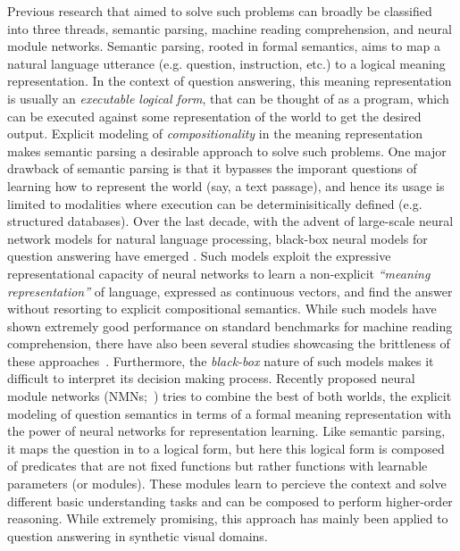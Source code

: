 \documentclass[main.tex]{subfiles}
\begin{document}
Previous research that aimed to solve such problems can broadly be classified into three threads, semantic parsing, machine reading comprehension, and neural module networks.  Semantic parsing, rooted in formal semantics, aims to map a natural language utterance (e.g. question, instruction, etc.) to a logical meaning representation.  In the context of question answering, this meaning representation is usually an \textit{executable logical form}, that can be thought of as a program, which can be executed against some representation of the world to get the desired output.  Explicit modeling of \textit{compositionality} in the meaning representation makes semantic parsing a desirable approach to solve such problems.
One major drawback of semantic parsing is that it bypasses the imporant questions of learning how to represent the world (say, a text passage), and hence its usage is limited to modalities where execution can be determinisitically defined (e.g. structured databases).
Over the last decade, with the advent of large-scale neural network models for natural language processing, black-box neural models for question answering have emerged \cite{bidaf-2016,qanet-2018,bert-2018}.
Such models exploit the expressive representational capacity of neural networks to learn a non-explicit \textit{``meaning representation''} of language, expressed as continuous vectors, and find the answer without resorting to explicit compositional semantics.  While such models have shown extremely good performance on standard benchmarks for machine reading comprehension, there have also been several studies showcasing the brittleness of these approaches~\cite{adversarial-squad-2017,sears-2018,pathologies-nlp-2018}.  Furthermore, the \textit{black-box} nature of such models makes it difficult to interpret its decision making process.
Recently proposed neural module networks (NMNs;~) tries to combine the best of both worlds, the explicit modeling of question semantics in terms of a formal meaning representation with the power of neural networks for representation learning.  Like semantic parsing, it maps the question in to a logical form, but here this logical form is composed of predicates that are not fixed functions but rather functions with learnable parameters (or modules).  These modules learn to percieve the context and solve different basic understanding tasks and can be composed to perform higher-order reasoning.  While extremely promising, this approach has mainly been applied to question answering in synthetic visual domains. %
\end{document}
